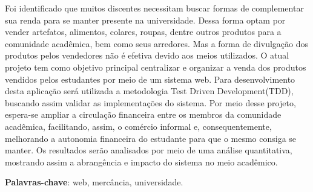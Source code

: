 
\setlength{\absparsep}{18pt} %
\begin{resumo}
Foi identificado que muitos discentes necessitam buscar formas de complementar sua renda para se manter presente na universidade. Dessa forma optam por vender artefatos, alimentos, colares, roupas, dentre outros produtos para a comunidade acadêmica, bem como seus arredores. Mas a forma de divulgação dos produtos pelos vendedores não é efetiva devido aos meios utilizados. O atual projeto tem como objetivo principal centralizar e organizar a venda dos produtos vendidos pelos estudantes por meio de um sistema web. Para desenvolvimento desta aplicação será utilizada a metodologia Test Driven Development(TDD), buscando assim validar as implementações do sistema. Por meio desse projeto, espera-se ampliar a circulação financeira entre os membros da comunidade acadêmica, facilitando, assim, o comércio informal e, consequentemente, melhorando a autonomia financeira do estudante para que o mesmo consiga se manter. Os resultados serão analisados por meio de uma análise quantitativa, mostrando assim a abrangência e impacto do sistema no meio acadêmico.


 \textbf{Palavras-chave}: web, mercância, universidade.
\end{resumo}


 

% 
%
%  
